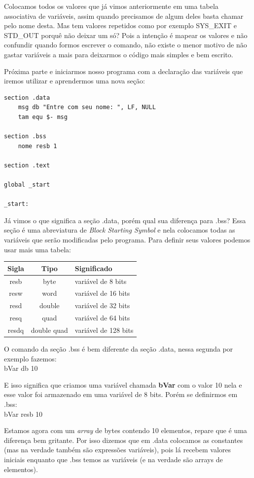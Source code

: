 Colocamos todos os valores que já vimos anteriormente em uma tabela associativa de variáveis, assim quando precisamos de algum deles basta chamar pelo nome desta. Mas tem valores repetidos como por exemplo SYS\_EXIT e STD\_OUT porquê não deixar um só? Pois a intenção é mapear os valores e não confundir quando formos escrever o comando, não existe o menor motivo de não gastar variáveis a mais para deixarmos o código mais simples e bem escrito.

Próxima parte e iniciarmos nosso programa com a declaração das variáveis que iremos utilizar e aprendermos uma nova seção:
\begin{lstlisting}[]
section .data
	msg db "Entre com seu nome: ", LF, NULL
	tam equ $- msg

section .bss
	nome resb 1

section .text

global _start

_start:
\end{lstlisting}

Já vimos o que significa a seção .data, porém qual sua diferença para .bss? Essa seção é uma abreviatura de \textit{Block Starting Symbol} e nela colocamos todas as variáveis que serão modificadas pelo programa. Para definir seus valores podemos usar mais uma tabela:
\begin{table}[H]
	\centering 
	\begin{tabular}{c | c | l }
		\textbf{Sigla} & \textbf{Tipo} & \textbf{Significado} \\ \hline
		resb & byte & variável de 8 bits \\
		resw & word & variável de 16 bits \\
		resd & double & variável de 32 bits \\
		resq & quad & variável de 64 bits \\
		resdq & double quad & variável de 128 bits
	\end{tabular}
\end{table}

O comando da seção .bss é bem diferente da seção .data, nessa segunda por exemplo fazemos: \\
{\ttfamily bVar db 10}

E isso significa que criamos uma variável chamada \textbf{bVar} com o valor 10 nela e esse valor foi armazenado em uma variável de 8 bits. Porém se definirmos em .bss: \\
{\ttfamily bVar resb 10}

Estamos agora com um \textit{array} de bytes contendo 10 elementos, repare que é uma diferença bem gritante. Por isso dizemos que em .data colocamos as constantes (mas na verdade também são expressões variáveis), pois lá recebem valores iniciais enquanto que .bss temos as variáveis (e na verdade são arrays de elementos).

